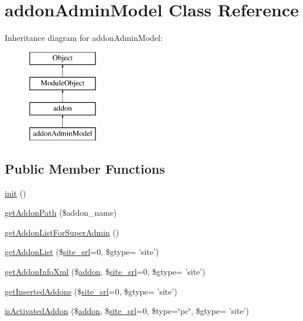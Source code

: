 \hypertarget{classaddonAdminModel}{\section{addon\-Admin\-Model Class Reference}
\label{classaddonAdminModel}
}
Inheritance diagram for addon\-Admin\-Model\-:\begin{figure}[H]
\begin{center}
\leavevmode
\includegraphics[height=4.000000cm]{classaddonAdminModel}
\end{center}
\end{figure}
\subsection*{Public Member Functions}
\begin{DoxyCompactItemize}
\item 
\hyperlink{classaddonAdminModel_aed6091be1c24a8c5fcf101b664300b00}{init} ()
\item 
\hyperlink{classaddonAdminModel_ab4fea679a0059be718e449b31a88c46f}{get\-Addon\-Path} (\$addon\-\_\-name)
\item 
\hyperlink{classaddonAdminModel_a056c3d3567ae957b9a5635397dd78b9e}{get\-Addon\-List\-For\-Super\-Admin} ()
\item 
\hyperlink{classaddonAdminModel_abd8052e647a7ea4224e0680663fca536}{get\-Addon\-List} (\$\hyperlink{ko_8install_8php_a8b1406b4ad1048041558dce6bfe89004}{site\-\_\-srl}=0, \$gtype= 'site')
\item 
\hyperlink{classaddonAdminModel_a9019b55b1c67ac658259bfd78bd74e4a}{get\-Addon\-Info\-Xml} (\$\hyperlink{classaddon}{addon}, \$\hyperlink{ko_8install_8php_a8b1406b4ad1048041558dce6bfe89004}{site\-\_\-srl}=0, \$gtype= 'site')
\item 
\hyperlink{classaddonAdminModel_a59cd95bf540c78d29043029f292c201b}{get\-Inserted\-Addons} (\$\hyperlink{ko_8install_8php_a8b1406b4ad1048041558dce6bfe89004}{site\-\_\-srl}=0, \$gtype= 'site')
\item 
\hyperlink{classaddonAdminModel_ac5b47c66d9e5d0daea7e857676f2b7ec}{is\-Activated\-Addon} (\$\hyperlink{classaddon}{addon}, \$\hyperlink{ko_8install_8php_a8b1406b4ad1048041558dce6bfe89004}{site\-\_\-srl}=0, \$type=\char`\"{}pc\char`\"{}, \$gtype= 'site')
\end{DoxyCompactItemize}
